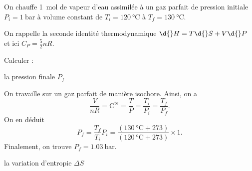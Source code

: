 



\hauteurLargeurCadreReponse		{7mm}{2.5cm}
\typeEntrainement				{} %
\initialisationEntrainement

On chauffe \SI{1}{\mol} de vapeur d'eau assimilée à un gaz parfait de pression initiale $P_i=\SI{1}{\bar}$ à volume constant de $T_i=\SI{120}{\celsius}$ à $T_f=\SI{130}{\celsius}$. 

On rappelle la seconde identité thermodynamique $\d{}H=T\d{}S+V\d{}P$ et ici $C_P=\frac{5}{2}nR$.

Calculer : 

\debutEntrainement


\begin{enonce}
la pression finale $P_f$
\end{enonce}


\begin{corrige}
On travaille sur un gaz parfait de manière isochore. Ainsi, on a
\[
\frac{V}{nR}=\mathrm{C^{te}}=\frac{T}{P}=\frac{T_i}{P_i}=\frac{T_f}{P_f}.
\]
On en déduit
\[
P_f=\frac{T_f}{T_i}P_i=\frac{(\SI{130}{\celsius}+273)}{(\SI{120}{\celsius}+273)}\times1.
\]
Finalement, on trouve $P_f=\SI{1,03}{\bar}$.
\end{corrige}




\begin{enonce}
la variation d'entropie $\Delta S$
\end{enonce}

